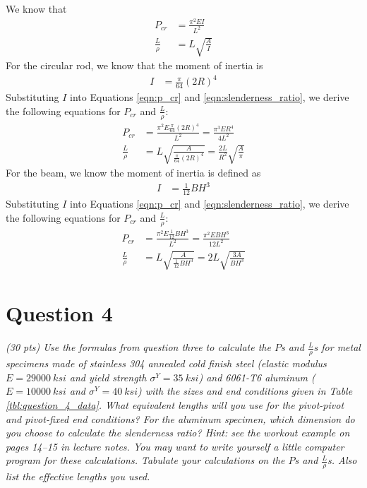 \documentclass[12 pt]{article}
\begin{document}
We know that
\begin{align}
	P_{cr}&=\frac{\pi^2EI}{L^2}\label{eqn:p_cr}\\
	\frac{L}{\rho}&=L\sqrt{\frac{A}{I}}\label{eqn:slenderness_ratio}
\end{align}
For the circular rod, we know that the moment of inertia is
\begin{align*}
	I&=\frac{\pi}{64}(2R)^4
\end{align*}
Substituting $I$ into Equations \ref{eqn:p_cr} and \ref{eqn:slenderness_ratio}, we derive the following equations for $P_{cr}$ and $\frac{L}{\rho}$:
\begin{align}
	P_{cr}&=\frac{\pi^2E\frac{\pi}{64}(2R)^4}{L^2}=\frac{\pi^3ER^4}{4L^2}\label{eqn:P_cr_rod}\\
	\frac{L}{\rho}&=L\sqrt{\frac{A}{\frac{\pi}{64}(2R)^4}}=\frac{2L}{R^2}\sqrt{\frac{A}{\pi}}\label{eqn:slenderness_ratio_rod}
\end{align}
For the beam, we know the moment of inertia is defined as
\begin{align*}
	I&=\frac{1}{12}BH^3
\end{align*}
Substituting $I$ into Equations \ref{eqn:p_cr} and \ref{eqn:slenderness_ratio}, we derive the following equations for $P_{cr}$ and $\frac{L}{\rho}$:
\begin{align}
	P_{cr}&=\frac{\pi^2E\frac{1}{12}BH^3}{L^2}=\frac{\pi^2EBH^3}{12L^2}\label{eqn:P_cr_beam}\\
	\frac{L}{\rho}&=L\sqrt{\frac{A}{\frac{1}{12}BH^3}}=2L\sqrt{\frac{3A}{BH^3}}\label{eqn:slenderness_ratio_beam}
\end{align}

\section*{Question 4}
\textit{(\num{30} pts) Use the formulas from question three to calculate the $P$s and $\frac{L}{\rho}$s for metal specimens made of stainless 304 annealed cold finish steel (elastic modulus $E=\qty{29000}{ksi}$ and yield strength $\sigma^Y=\qty{35}{ksi}$) and 6061-T6 aluminum ($E=\qty{10000}{ksi}$ and $\sigma^Y=\qty{40}{ksi}$) with the sizes and end conditions given in Table \ref{tbl:question_4_data}. What equivalent lengths will you use for the pivot-pivot and pivot-fixed end conditions? For the  aluminum specimen, which dimension do you choose to calculate the slenderness ratio? Hint: see the workout example on pages \numrange{14}{15} in lecture notes. You may want to write yourself a little computer program for these calculations. Tabulate your calculations on the $P$s and $\frac{L}{\rho}$s. Also list the effective lengths you used.}
\end{document}
